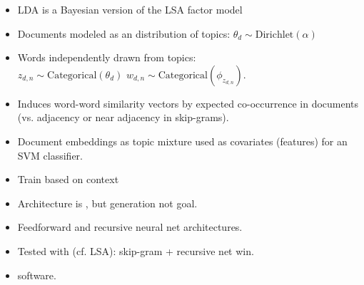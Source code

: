 \documentclass[10pt]{report}
\begin{document}
\begin{itemize}
\item LDA is a Bayesian version of the LSA factor model
\item Documents modeled as an distribution of topics: $\theta_d \sim \textrm{Dirichlet}(\alpha)$
\item Words independently drawn from topics:\\ $z_{d,n} \sim
  \textrm{Categorical}(\theta_d)$ \qquad \quad $w_{d,n} \sim \textrm{Categorical}(\phi_{z_{d,n}})$.
\item Induces word-word similarity vectors by expected co-occurrence
  in documents (vs. adjacency or near adjacency in skip-grams).
\item Document embeddings as topic mixture used as covariates
  (features) for an SVM classifier.
\end{itemize}
\vfill
{}

\begin{itemize}
\item Train  based on context
\item Architecture is , but generation not goal.
\item Feedforward and recursive neural net architectures.
\item Tested with  (cf. LSA): skip-gram +
  recursive net win.
\item {} software. 
\end{itemize}
\vfill 
{}
\end{document}
